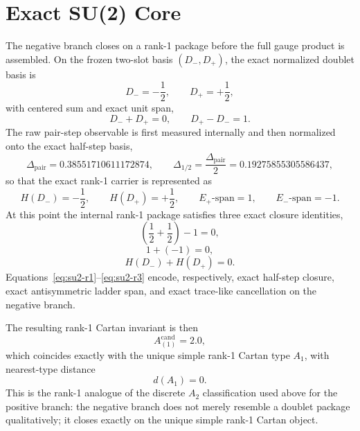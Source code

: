 \documentclass[11pt]{article}
\begin{document}
\section{Exact SU(2) Core}
The negative branch closes on a rank-1 package before the full gauge product is assembled. On the frozen two-slot basis $(D_-,D_+)$, the exact normalized doublet basis is
\begin{equation}
D_-=-\frac{1}{2},\qquad D_+=+\frac{1}{2},
\label{eq:su2-doublet-basis}
\end{equation}
with centered sum and exact unit span,
\begin{equation}
D_-+D_+=0,\qquad D_+-D_-=1.
\label{eq:su2-center-span}
\end{equation}
The raw pair-step observable is first measured internally and then normalized onto the exact half-step basis,
\begin{equation}
\Delta_{\mathrm{pair}}=0.38551710611172874,\qquad
\Delta_{1/2}=\frac{\Delta_{\mathrm{pair}}}{2}=0.19275855305586437,
\label{eq:su2-raw-half-step}
\end{equation}
so that the exact rank-1 carrier is represented as
\begin{equation}
H(D_-)=-\frac{1}{2},\qquad H(D_+)=+\frac{1}{2},\qquad E_+\text{-span}=1,\qquad E_-\text{-span}=-1.
\label{eq:su2-cartan-package}
\end{equation}
At this point the internal rank-1 package satisfies three exact closure identities,
\begin{equation}
\left(\frac{1}{2}+\frac{1}{2}\right)-1=0,
\label{eq:su2-r1}
\end{equation}
\begin{equation}
1+(-1)=0,
\label{eq:su2-r2}
\end{equation}
\begin{equation}
H(D_-)+H(D_+)=0.
\label{eq:su2-r3}
\end{equation}
Equations~\eqref{eq:su2-r1}--\eqref{eq:su2-r3} encode, respectively, exact half-step closure, exact antisymmetric ladder span, and exact trace-like cancellation on the negative branch.

The resulting rank-1 Cartan invariant is then
\begin{equation}
A^{\mathrm{cand}}_{(1)}=2.0,
\label{eq:su2-cartan-invariant}
\end{equation}
which coincides exactly with the unique simple rank-1 Cartan type $A_1$, with nearest-type distance
\begin{equation}
d(A_1)=0.
\label{eq:su2-a1-distance}
\end{equation}
This is the rank-1 analogue of the discrete $A_2$ classification used above for the positive branch: the negative branch does not merely resemble a doublet package qualitatively; it closes exactly on the unique simple rank-1 Cartan object.
\end{document}
